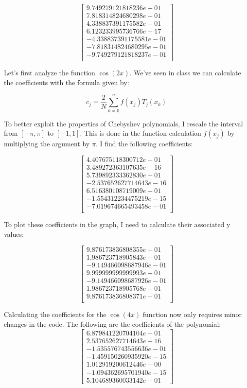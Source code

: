 \documentclass{article}
\begin{document}
$$
\begin{bmatrix} 
9.749279121818236e-01\\
7.818314824680298e-01\\
4.338837391175582e-01\\
6.123233995736766e-17\\
-4.338837391175581e-01\\
-7.818314824680295e-01\\
-9.749279121818237e-01\\
\end{bmatrix}
$$

Let's first analyze the function $\cos(2x)$. We've seen in class we can calculate the coefficients with the formula given by:

$$c_j=\frac{2}{N}\sum_{k=0}^{n}f(x_j)T_j(x_k)$$

To better exploit the properties of Chebyshev polynomials, I rescale the interval from $[-\pi,\pi]$ to $[-1,1]$. This is done in the function calculation $f(x_j)$ by multiplying the argument by $\pi$. I find the following coefficients:

$$
\begin{bmatrix} 
4.407675118300712e-01\\
3.489272363107635e-16\\
5.739892333362830e-01\\
-2.537652627714643e-16\\
6.516380108719009e-01\\
-1.554312234475219e-15\\
-7.019674665493458e-01\\
\end{bmatrix}
$$

To plot these coefficients in the graph, I need to calculate their associated y values:

$$
\begin{bmatrix}
9.876173836808355e-01\\
1.986723718905843e-01\\
-9.149466098687946e-01\\
9.999999999999993e-01\\
-9.149466098687926e-01\\
1.986723718905768e-01\\
9.876173836808371e-01\\
\end{bmatrix}
$$

Calculating the coefficients for the $\cos(4x)$ function now only requires minor changes in the code. The following are the coefficients of the polynomial:
$$
\begin{bmatrix} 
6.879841220704104e-01\\
2.537652627714643e-16\\
-1.535576743556636e-01\\
-1.459150260935920e-15\\
1.012919200612446e+00\\
-1.094362695701940e-15\\
5.104689360033142e-01
\end{bmatrix}
$$
\end{document}
